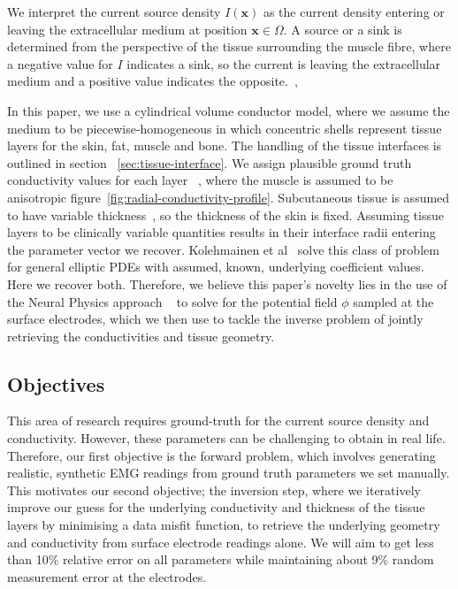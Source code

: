 \documentclass[final-report]{report-template}
\begin{document}
We interpret the current source density $I(\mathbf{x})$ as the current density entering or leaving the extracellular medium at position $\mathbf{x} \in \Omega$. A source or a sink is determined from the perspective of the tissue surrounding the muscle fibre, where a negative value for $I$ indicates a sink, so the current is leaving the extracellular medium and a positive value indicates the opposite.~\cite{nicholson1975},~\cite{pettersen2012}

In this paper, we use a cylindrical volume conductor model, where we assume the medium to be piecewise-homogeneous in which concentric shells represent tissue layers for the skin, fat, muscle and bone. The handling of the tissue interfaces is outlined in section ~\ref{sec:tissue-interface}. We assign plausible ground truth conductivity values for each layer ~\cite{farina2004}, where the muscle is assumed to be anisotropic figure~\ref{fig:radial-conductivity-profile}. Subcutaneous tissue is assumed to have variable thickness~\cite{mesin2013}, so the thickness of the skin is fixed. Assuming tissue layers to be clinically variable quantities results in their interface radii entering the parameter vector we recover. Kolehmainen et al~\cite{kolehmainen1999} solve this class of problem for general elliptic PDEs with assumed, known, underlying coefficient values. Here we recover both. Therefore, we believe this paper's novelty lies in the use of the Neural Physics approach ~\cite{chen2026} to solve for the potential field $\phi$ sampled at the surface electrodes, which we then use to tackle the inverse problem of jointly retrieving the conductivities and tissue geometry.

\subsection{Objectives}

This area of research requires ground-truth for the current source density and conductivity. However, these parameters can be challenging to obtain in real life. Therefore, our first objective is the forward problem, which involves generating realistic, synthetic EMG readings from ground truth parameters we set manually. This motivates our second objective; the inversion step, where we iteratively improve our guess for the underlying conductivity and thickness of the tissue layers by minimising a data misfit function, to retrieve the underlying geometry and conductivity from surface electrode readings alone. We will aim to get less than 10\% relative error on all parameters while maintaining about 9\% random measurement error at the electrodes.
\end{document}
